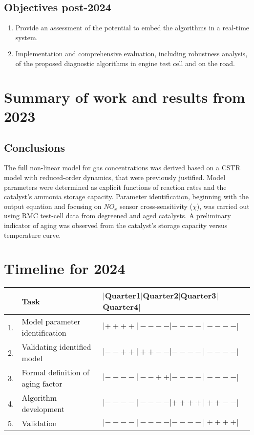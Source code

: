 \documentclass[letterpaper, 11pt]{article}
\begin{document}
\subsection{Objectives post-2024}
\begin{enumerate}
    \item Provide an assessment of the potential to embed the algorithms in a real-time system.
    \item Implementation and comprehensive evaluation, including robustness analysis, of the proposed diagnostic algorithms in engine test cell and on the road.
\end{enumerate}



\section{Summary of work and results from 2023}




\subsection{Conclusions}
The full non-linear model for gas concentrations was derived based on a CSTR
model with reduced-order dynamics, that were previously justified. Model
parameters were determined as explicit functions of reaction rates and the
catalyst's ammonia storage capacity.  Parameter identification, beginning with
the output equation and focusing on $NO_x$ sensor cross-sensitivity ($\chi$),
was carried out using RMC test-cell data from degreened and aged catalysts. A
preliminary indicator of aging was observed from the catalyst's storage capacity
versus temperature curve.


\section{Timeline for 2024}

\begin{table}[H]
    \centering
    \begin{tabular}{l l l}
        \hline\hline
                & Task & $|$Quarter1$|$Quarter2$|$Quarter3$|$Quarter4$|$ \\\hline\hline
        1.      & Model parameter identification   & $|++++|----|----|----|$\\
        2.      & Validating identified model      & $|--++|++--|----|----|$\\
        3.      & Formal definition of aging factor& $|----|--++|----|----|$\\
        4.      & Algorithm development            & $|----|----|++++|++--|$\\
        5.      & Validation                       & $|----|----|----|++++|$\\
        \hline\hline
    \end{tabular}
\end{table}
\end{document}
